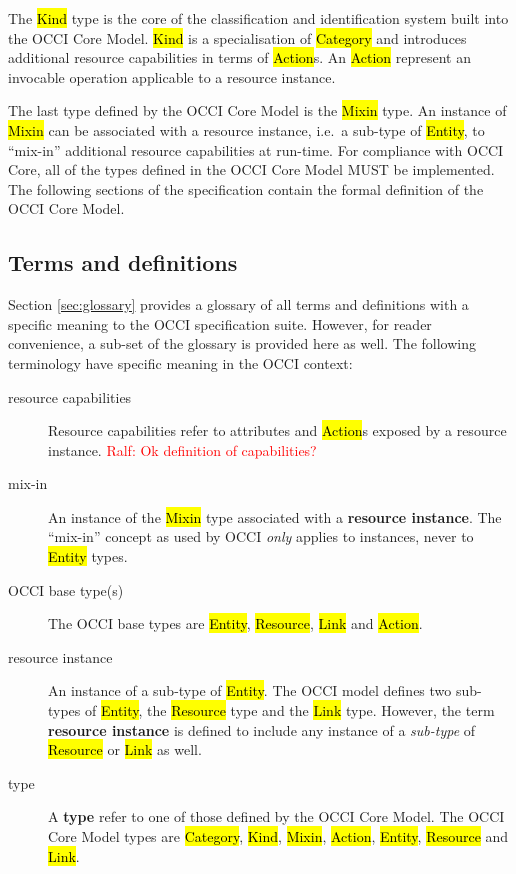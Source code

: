 \documentclass[10pt,a4paper]{article}
\newcommand{\ralf}[1]{\textcolor{red}{Ralf: #1}}
\begin{document}
The \hl{Kind} type is the core of the classification and identification
system built into the OCCI Core Model. \hl{Kind} is a specialisation of
\hl{Category} and introduces additional resource capabilities in terms of \hl{Action}s.
An \hl{Action} represent an invocable operation applicable to a resource
instance.

The last type defined by the OCCI Core Model is the \hl{Mixin} type. An instance of
\hl{Mixin} can be associated with a resource instance, i.e.~a sub-type of
\hl{Entity}, to ``mix-in'' additional resource capabilities at run-time.
%
For compliance with OCCI Core, all of the types defined in the OCCI Core Model MUST
be implemented.  The following sections of the specification contain the formal
definition of the OCCI Core Model.

\subsection{Terms and definitions}
Section \ref{sec:glossary} provides a glossary of all terms and definitions with
a specific meaning to the OCCI specification suite. However, for reader
convenience, a sub-set of the glossary is provided here as well. The following
terminology have specific meaning in the OCCI context:
\begin{description}
\item[resource capabilities] Resource capabilities refer to attributes and
 \hl{Action}s exposed by a resource instance.
\ralf{Ok definition of capabilities?}
\item[mix-in] An instance of the \hl{Mixin} type associated with a {\bf resource
 instance}. The ``mix-in'' concept as used by OCCI {\em only} applies to
 instances, never to \hl{Entity} types.
\item[OCCI base type(s)] The OCCI base types are \hl{Entity}, \hl{Resource},
 \hl{Link} and \hl{Action}.
\item[resource instance] An instance of a sub-type of \hl{Entity}. The OCCI
 model defines two sub-types of \hl{Entity}, the \hl{Resource} type and the
 \hl{Link} type.  However, the term {\bf resource instance} is defined to
 include any instance of a {\em sub-type} of \hl{Resource} or \hl{Link} as
 well.
\item[type] A {\bf type} refer to one of those defined by the OCCI Core Model.
The OCCI Core Model types are \hl{Category}, \hl{Kind}, \hl{Mixin}, \hl{Action},
\hl{Entity}, \hl{Resource} and \hl{Link}.
\end{description}
\end{document}
